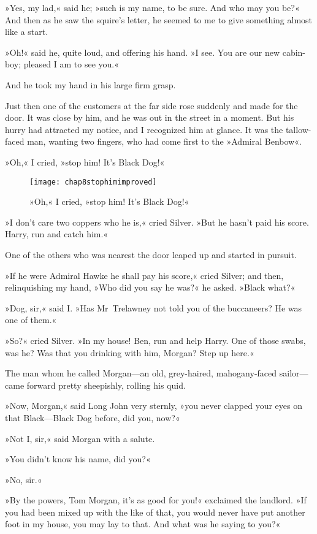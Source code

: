 »Yes, my lad,« said he; »such is my name, to be sure. And who may you be?« And then as he saw the squire's letter, he seemed to me to give something almost like a start.

»Oh!« said he, quite loud, and offering his hand. »I see. You are our new cabin-boy; pleased I am to see you.«

And he took my hand in his large firm grasp.

Just then one of the customers at the far side rose suddenly and made for the door. It was close by him, and he was out in the street in a moment. But his hurry had attracted my notice, and I recognized him at glance. It was the tallow-faced man, wanting two fingers, who had come first to the »Admiral Benbow«.

»Oh,« I cried, »stop him! It's Black Dog!«

\begin{sidewaysfigure}
\texttt{[image: chap8stophimimproved]}%
\caption{»Oh,« I cried, »stop him! It's Black Dog!«}
\end{sidewaysfigure}

»I don't care two coppers who he is,« cried Silver. »But he hasn't paid his score. Harry, run and catch him.«

One of the others who was nearest the door leaped up and started in pursuit.

»If he were Admiral Hawke he shall pay his score,« cried Silver; and then, relinquishing my hand, »Who did you say he was?« he asked. »Black what?«

»Dog, sir,« said I. »Has Mr~Trelawney not told you of the buccaneers? He was one of them.«

»So?« cried Silver. »In my house! Ben, run and help Harry. One of those swabs, was he? Was that you drinking with him, Morgan? Step up here.«

The man whom he called Morgan—an old, grey-haired, mahogany-faced sailor—came forward pretty sheepishly, rolling his quid.

»Now, Morgan,« said Long John very sternly, »you never clapped your eyes on that Black—Black Dog before, did you, now?«

»Not I, sir,« said Morgan with a salute.

»You didn't know his name, did you?«

»No, sir.«

»By the powers, Tom Morgan, it's as good for you!« exclaimed the landlord. »If you had been mixed up with the like of that, you would never have put another foot in my house, you may lay to that. And what was he saying to you?«


